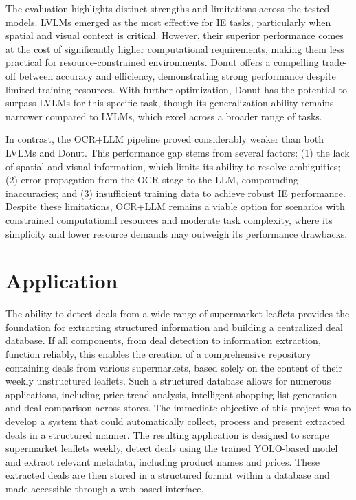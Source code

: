 \documentclass[11pt]{article}
\begin{document}
 The evaluation highlights distinct strengths and limitations across the tested models. LVLMs emerged as the most effective for IE tasks, particularly when spatial and visual context is critical. However, their superior performance comes at the cost of significantly higher computational requirements, making them less practical for resource-constrained environments. Donut offers a compelling trade-off between accuracy and efficiency, demonstrating strong performance despite limited training resources. With further optimization, Donut has the potential to surpass LVLMs for this specific task, though its generalization ability remains narrower compared to LVLMs, which excel across a broader range of tasks.

In contrast, the OCR+LLM pipeline proved considerably weaker than both LVLMs and Donut. This performance gap stems from several factors: (1) the lack of spatial and visual information, which limits its ability to resolve ambiguities; (2) error propagation from the OCR stage to the LLM, compounding inaccuracies; and (3) insufficient training data to achieve robust IE performance. Despite these limitations, OCR+LLM remains a viable option for scenarios with constrained computational resources and moderate task complexity, where its simplicity and lower resource demands may outweigh its performance drawbacks.


\section{Application}
\label{sec:application}
The ability to detect deals from a wide range of supermarket leaflets provides the foundation for extracting structured information and building a centralized deal database. If all components, from deal detection to information extraction, function reliably, this enables the creation of a comprehensive repository containing deals from various supermarkets, based solely on the content of their weekly unstructured leaflets. Such a structured database allows for numerous applications, including price trend analysis, intelligent shopping list generation and deal comparison across stores. The immediate objective of this project was to develop a system that could automatically collect, process and present extracted deals in a structured manner. The resulting application is designed to scrape supermarket leaflets weekly, detect deals using the trained YOLO-based model and extract relevant metadata, including product names and prices. These extracted deals are then stored in a structured format within a database and made accessible through a web-based interface.
\end{document}
